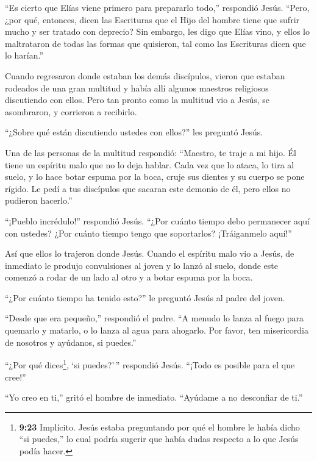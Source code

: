  ``Es cierto que Elías viene primero para prepararlo
todo,'' respondió Jesús. ``Pero, ¿por qué, entonces, dicen las
Escrituras que el Hijo del hombre tiene que sufrir mucho y ser tratado
con deprecio?  Sin embargo, les digo que Elías vino, y
ellos lo maltrataron de todas las formas que quisieron, tal como las
Escrituras dicen que lo harían.''

 Cuando regresaron donde estaban los demás discípulos,
vieron que estaban rodeados de una gran multitud y había allí algunos
maestros religiosos discutiendo con ellos.  Pero tan pronto
como la multitud vio a Jesús, se asombraron, y corrieron a recibirlo.

 ``¿Sobre qué están discutiendo ustedes con ellos?'' les
preguntó Jesús.

 Una de las personas de la multitud respondió: ``Maestro,
te traje a mi hijo. Él tiene un espíritu malo que no lo deja hablar.
 Cada vez que lo ataca, lo tira al suelo, y lo hace botar
espuma por la boca, cruje sus dientes y su cuerpo se pone rígido. Le
pedí a tus discípulos que sacaran este demonio de él, pero ellos no
pudieron hacerlo.''

 ``¡Pueblo incrédulo!'' respondió Jesús. ``¿Por cuánto
tiempo debo permanecer aquí con ustedes? ¿Por cuánto tiempo tengo que
soportarlos? ¡Tráiganmelo aquí!''

 Así que ellos lo trajeron donde Jesús. Cuando el espíritu
malo vio a Jesús, de inmediato le produjo convulsiones al joven y lo
lanzó al suelo, donde este comenzó a rodar de un lado al otro y a botar
espuma por la boca.

 ``¿Por cuánto tiempo ha tenido esto?'' le preguntó Jesús
al padre del joven.

``Desde que era pequeño,'' respondió el padre.  ``A menudo
lo lanza al fuego para quemarlo y matarlo, o lo lanza al agua para
ahogarlo. Por favor, ten misericordia de nosotros y ayúdanos, si
puedes.''

 ``¿Por qué dices\footnote{\textbf{9:23} Implícito. Jesús
  estaba preguntando por qué el hombre le había dicho ``si puedes,'' lo
  cual podría sugerir que había dudas respecto a lo que Jesús podía
  hacer.}, `si puedes?'\,'' respondió Jesús. ``¡Todo es posible para el
que cree!''

 ``Yo creo en ti,'' gritó el hombre de inmediato. ``Ayúdame
a no desconfiar de ti.''

